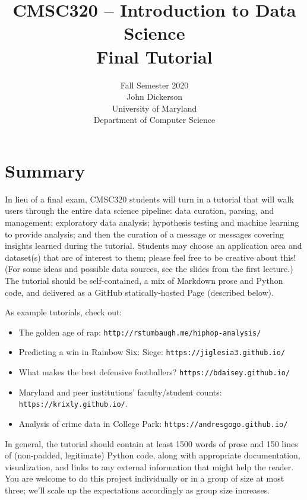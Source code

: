 \documentclass[11pt]{article}
\title{\vspace{-0.7in} CMSC320 -- Introduction to Data Science\\
\textbf{Final Tutorial}}
\author{Fall Semester 2020\\[.2in]
  John Dickerson\\
  University of Maryland\\
  Department of Computer Science}
\date{}
\begin{document}
\maketitle


\section{Summary}
In lieu of a final exam, CMSC320 students will turn in a tutorial that will walk users through the entire data science pipeline: data curation, parsing, and management; exploratory data analysis; hypothesis testing and machine learning to provide analysis; and then the curation of a message or messages covering insights learned during the tutorial.  Students may choose an application area and dataset(s) that are of interest to them; please feel free to be creative about this!  (For some ideas and possible data sources, see the slides from the first lecture.)  The tutorial should be self-contained, a mix of Markdown prose and Python code, and delivered as a GitHub statically-hosted Page (described below).

As example tutorials, check out:
\begin{itemize}
\item The golden age of rap: \texttt{http://rstumbaugh.me/hiphop-analysis/}
\item Predicting a win in Rainbow Six: Siege: \texttt{https://jiglesia3.github.io/}
\item What makes the best defensive footballers?  \texttt{https://bdaisey.github.io/}
\item Maryland and peer institutions' faculty/student counts: \texttt{https://krixly.github.io/}.
\item Analysis of crime data in College Park: \texttt{https://andresgogo.github.io/}
\end{itemize}
In general, the tutorial should contain at least 1500 words of prose and 150 lines of (non-padded, legitimate) Python code, along with appropriate documentation, visualization, and links to any external information that might help the reader.  You are welcome to do this project individually or in a group of size at most three; we'll scale up the expectations accordingly as group size increases.
\end{document}
